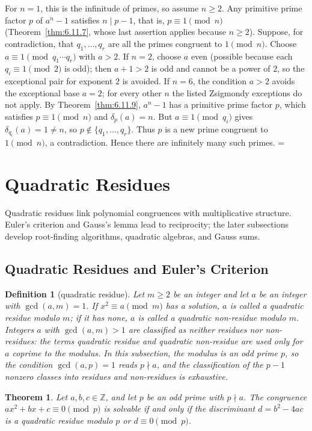 \documentclass[11pt]{article}
\makeatletter
\theoremstyle{ntstyle}
\newtheorem{theorem}{Theorem}[subsection]
\newtheorem{definition}{Definition}[subsection]
\let\nt@closedisplay\]
\def\nt@guardedclose{\@ifnextchar\par{\nt@closeafterpar}{\@ifnextchar\end{\postdisplaypenalty\@M\nt@closedisplay}{\nt@closedisplay}}}
\def\nt@closeafterpar\par{\@ifnextchar\par{\nt@closeafterpar}{\@ifnextchar\end{\postdisplaypenalty\@M\nt@closedisplay\par}{\nt@closedisplay\par}}}
\renewenvironment{proof}[1][\proofname]{\par
  \pushQED{\qed}\normalfont\topsep\medskipamount\edef\nt@afterproof{\@endparpenalty=\the\@endparpenalty\relax}\@beginparpenalty\@M\@endparpenalty\@M\let\]\nt@guardedclose\trivlist\item[]\textit{#1\@addpunct{.}} \ignorespaces}{\ifvmode\addpenalty\@M\fi\popQED\nt@afterproof\endtrivlist\@endpefalse}
\makeatother
\begin{document}
\begin{proof} For $n = 1$, this is the infinitude of
	primes, so assume $n \ge 2$. Any primitive prime factor $p$ of $a^{n} -
		1$ satisfies $n \mid p - 1$, that is, $p \equiv 1 \pmod{n}$ (Theorem~\ref{thm:6.11.7}, whose last
		assertion applies because $n \ge 2$). Suppose, for contradiction, that $q_1, \ldots, q_r$ are all
	the primes congruent to $1 \pmod{n}$. Choose $a\equiv1\pmod{q_1\cdots q_r}$ with $a>2$. If $n=2$,
	choose $a$ even (possible because each $q_i\equiv1\pmod{2}$ is odd); then $a+1>2$ is odd and
	cannot be a power of $2$, so the exceptional pair for exponent $2$ is avoided. If $n=6$, the
	condition $a>2$ avoids the exceptional base $a=2$; for every other $n$ the listed Zsigmondy
	exceptions do not apply. By Theorem~\ref{thm:6.11.9}, $a^{n} - 1$ has a primitive
	prime factor $p$, which satisfies $p \equiv 1 \pmod{n}$ and
	$\delta_p(a) = n$. But $a \equiv 1 \pmod{q_i}$ gives
	$\delta_{q_i}(a) = 1 \neq n$, so $p \notin \{q_1, \ldots,
		q_r\}$. Thus $p$ is a new prime congruent to $1 \pmod{n}$, a contradiction. Hence there
	are infinitely many such primes.
\end{proof}
\clearpage

\section{Quadratic Residues}

Quadratic residues link polynomial congruences with multiplicative structure. Euler's criterion and Gauss's lemma
lead to reciprocity; the later subsections develop root-finding algorithms, quadratic algebras, and Gauss sums.

\subsection{Quadratic Residues and Euler's Criterion}

\begin{definition}[quadratic residue]\label{def:7.1.1} Let $m \ge 2$ be an integer and let
	$a$ be an integer with $\gcd(a, m) = 1$. If $x^{2} \equiv a \pmod{m}$
	has a solution, $a$ is called a quadratic residue modulo $m$; if it
	has none, $a$ is called a quadratic non-residue modulo $m$. Integers
	$a$ with $\gcd(a, m) > 1$ are classified as neither residues nor non-residues: the terms
	quadratic residue and quadratic non-residue are used only for $a$
	coprime to the modulus. In this subsection, the modulus is an odd prime
	$p$, so the condition $\gcd(a, p) = 1$ reads $p \nmid a$, and the
	classification of the $p-1$ nonzero classes into residues and
	non-residues is exhaustive.
\end{definition}
\begin{theorem}\label{thm:7.1.1} Let $a,b,c\in\mathbb{Z}$, and let $p$ be an odd prime with $p \nmid a$. The congruence
	$ax^{2} + bx + c \equiv 0 \pmod{p}$ is solvable if and only if the
	discriminant $d = b^{2} - 4ac$ is a quadratic residue modulo $p$ or
	$d \equiv 0 \pmod{p}$.
\end{theorem}
\end{document}
